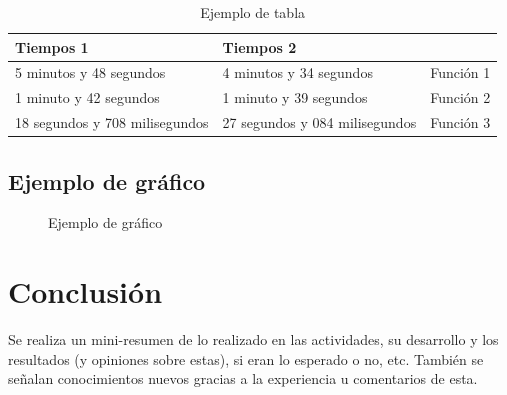 \documentclass[letter,12pt]{article}
\begin{document}
\begin{table}[H]
\centering
\begin{tabular}{|l|l|l|}
\hline
Tiempos 1 & Tiempos 2 &  \\ \hline
5 minutos y 48 segundos   & 4 minutos y 34 segundos & Función 1 \\ \hline
1 minuto y 42 segundos & 1 minuto y 39 segundos & Función 2 \\ \hline
18 segundos y 708 milisegundos & 27 segundos y 084 milisegundos & Función 3 \\ \hline
\end{tabular}
\caption{Ejemplo de tabla}
\end{table}

\subsection{Ejemplo de gráfico}

\begin{figure}[H]
\centering
{}
\caption{Ejemplo de gráfico}
\label{fig:barras_milisegundos}
\end{figure}

\newpage

\section{Conclusión}

Se realiza un mini-resumen de lo realizado en las actividades, su desarrollo y los resultados (y opiniones sobre estas), si eran lo esperado o no, etc. También se señalan conocimientos nuevos gracias a la experiencia u comentarios de esta.
\end{document}
